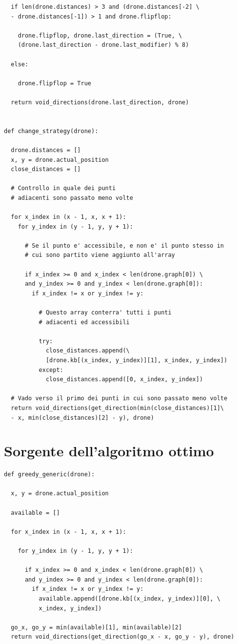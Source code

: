 \begin{verbatim}
  if len(drone.distances) > 3 and (drone.distances[-2] \
  - drone.distances[-1]) > 1 and drone.flipflop:

    drone.flipflop, drone.last_direction = (True, \
    (drone.last_direction - drone.last_modifier) % 8)

  else:

    drone.flipflop = True

  return void_directions(drone.last_direction, drone)


def change_strategy(drone):

  drone.distances = []
  x, y = drone.actual_position
  close_distances = []

  # Controllo in quale dei punti 
  # adiacenti sono passato meno volte

  for x_index in (x - 1, x, x + 1):
    for y_index in (y - 1, y, y + 1):

      # Se il punto e' accessibile, e non e' il punto stesso in 
      # cui sono partito viene aggiunto all'array

      if x_index >= 0 and x_index < len(drone.graph[0]) \
      and y_index >= 0 and y_index < len(drone.graph[0]):
        if x_index != x or y_index != y:

          # Questo array conterra' tutti i punti 
          # adiacenti ed accessibili

          try:
            close_distances.append(\
            [drone.kb[(x_index, y_index)][1], x_index, y_index])
          except:
            close_distances.append([0, x_index, y_index])

  # Vado verso il primo dei punti in cui sono passato meno volte
  return void_directions(get_direction(min(close_distances)[1]\
  - x, min(close_distances)[2] - y), drone)

\end{verbatim}


\section{Sorgente dell'algoritmo ottimo}
\begin{verbatim}
def greedy_generic(drone):

  x, y = drone.actual_position

  available = []

  for x_index in (x - 1, x, x + 1):

    for y_index in (y - 1, y, y + 1):

      if x_index >= 0 and x_index < len(drone.graph[0]) \
      and y_index >= 0 and y_index < len(drone.graph[0]):
        if x_index != x or y_index != y:
          available.append([drone.kb[(x_index, y_index)][0], \
          x_index, y_index])

  go_x, go_y = min(available)[1], min(available)[2]
  return void_directions(get_direction(go_x - x, go_y - y), drone)

\end{verbatim}
	
